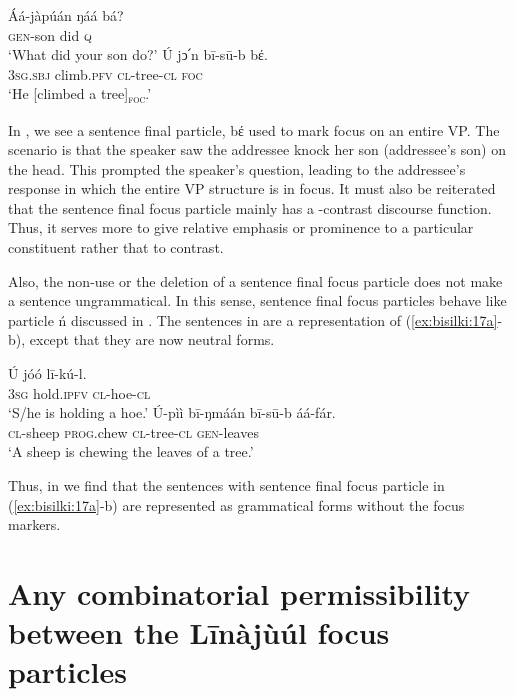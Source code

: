 \documentclass[output=paper,colorlinks,citecolor=brown]{langscibook}
\begin{document}
\ea%
    \label{ex:bisilki:19}
    \ea\label{ex:bisilki:19a}
    \gll    Áá-jàpúán	ŋáá	bá?\\
            \textsc{gen-}son	did	\textsc{q}\\
    \glt    ‘What did your son do?’
    \ex\label{ex:bisilki:19b}
    \gll    Ú		jↄ՛n		bī-sū-b	bέ.\\
            \textsc{3sg.sbj}	climb\textsc{.pfv}	\textsc{cl-}tree\textsc{-cl}	\textsc{foc}\\
    \glt    ‘He [climbed a tree]\textsubscript{\textsc{foc}}.’
    \z
\z

In , we see a sentence final particle, bέ used to mark focus on an entire VP. The scenario is that the speaker  saw the addressee  knock her son (addressee’s son) on the head. This prompted the speaker’s question, leading to the addressee’s response  in which the entire VP structure is in focus. It must also be reiterated that the sentence final focus particle mainly has a -contrast discourse function. Thus, it serves more to give relative emphasis or prominence to a particular constituent rather that to contrast.

Also, the non-use or the deletion of a sentence final focus particle does not make a sentence ungrammatical. In this sense, sentence final focus particles behave like particle ń discussed in . The sentences in  are a representation of (\ref{ex:bisilki:17a}-b), except that they are now neutral forms.

\ea%
    \label{ex:bisilki:20}
    \ea\label{ex:bisilki:20a}
    \gll    Ú	jóó		lī-kú-l.\\
            \textsc{3sg}	hold\textsc{.ipfv}	\textsc{cl-}hoe\textsc{-cl}\\
    \glt    ‘S/he is holding a hoe.’
    \ex\label{ex:bisilki:20b}
    \gll    Ú-pìì		bī-ŋmáán	bī-sū-b	áá-fár.\\
            \textsc{cl-}sheep	\textsc{prog.}chew	\textsc{cl-}tree\textsc{-cl}	\textsc{gen-}leaves\\
    \glt    ‘A sheep is chewing the leaves of a tree.’
    \z
\z

Thus, in  we find that the sentences with sentence final focus particle in (\ref{ex:bisilki:17a}-b) are represented as grammatical forms without the focus markers.

\section{Any combinatorial permissibility between the Līnàjùúl focus particles}\label{sec:bisilki:6}
\end{document}
